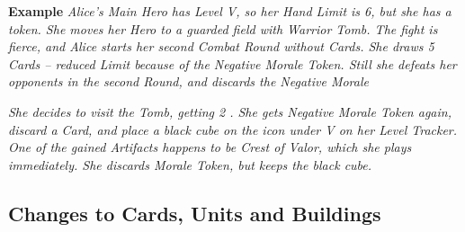 \begin{multicols*}{2}
    \textbf{Example} \textit{Alice's Main Hero has Level V, so her Hand Limit is 6, but she has a token. She moves her Hero to a guarded field with Warrior Tomb. The fight is fierce, and Alice starts her second Combat Round without Cards. She draws 5 Cards -- reduced Limit because of the Negative Morale Token. Still she defeats her opponents in the second Round, and discards the Negative Morale}
    
    \textit{She decides to visit the Tomb, getting 2 . She gets Negative Morale Token again, discard a Card, and place a black cube on the icon under V on her Level Tracker. One of the gained Artifacts happens to be Crest of Valor, which she plays immediately. She discards Morale Token, but keeps the black cube.}
    
    \subsection*{Changes to Cards, Units and Buildings}
    

\end{multicols*}
